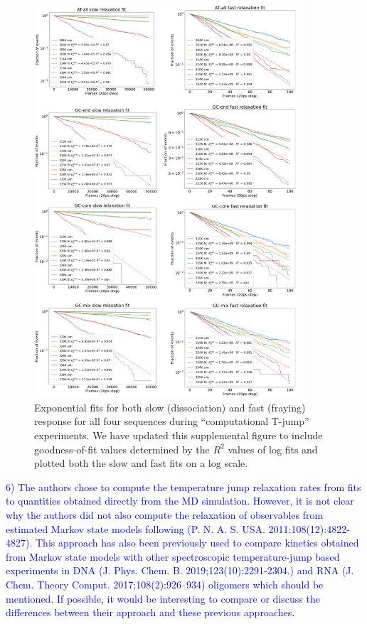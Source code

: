 \documentclass[11pt,a4paper]{letter} %
\begin{document}
\begin{figure}[ht!]
	\begin{center}
        \includegraphics[width=100mm]{cover_letter/revision_figures/goodness_of_fit.png}
        \caption{Exponential fits for both slow (dissociation) and fast (fraying) response for all four sequences during ``computational T-jump'' experiments. We have updated this supplemental figure to include goodness-of-fit values determined by the $R^2$ values of log fits and plotted both the slow and fast fits on a log scale.}
        \label{fig:goodness-of-fit}
	\end{center}
\end{figure}

\textcolor{blue}{6)       The authors chose to compute the temperature jump relaxation rates from fits to quantities obtained directly from the MD simulation. However, it is not clear why the authors did not also compute the relaxation of observables from estimated Markov state models following (P. N. A. S. USA. 2011;108(12):4822-4827). This approach has also been previously used to compare kinetics obtained from Markov state models with other spectroscopic temperature-jump based experiments in DNA (J. Phys. Chem. B. 2019;123(10):2291-2304.) and RNA (J. Chem. Theory Comput. 2017;108(2):926–934) oligomers which should be mentioned. If possible, it would be interesting to compare or discuss the differences between their approach and these previous approaches.}
\end{document}
